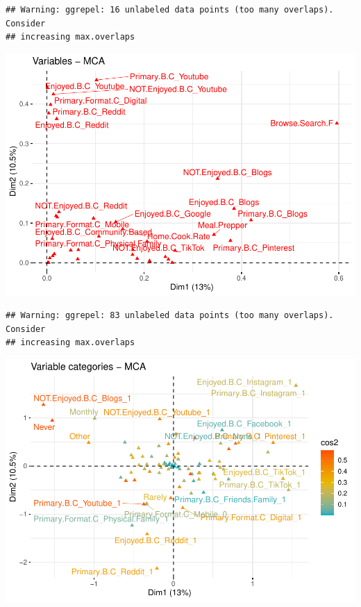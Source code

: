 \documentclass[
]{article}
\newenvironment{Shaded}{\begin{snugshade}}{\end{snugshade}}
\newcommand{\DataTypeTok}[1]{\textcolor[rgb]{0.13,0.29,0.53}{#1}}
\newcommand{\KeywordTok}[1]{\textcolor[rgb]{0.13,0.29,0.53}{\textbf{#1}}}
\newcommand{\NormalTok}[1]{#1}
\newcommand{\OtherTok}[1]{\textcolor[rgb]{0.56,0.35,0.01}{#1}}
\newcommand{\StringTok}[1]{\textcolor[rgb]{0.31,0.60,0.02}{#1}}
\begin{document}
\begin{verbatim}
## Warning: ggrepel: 16 unlabeled data points (too many overlaps). Consider
## increasing max.overlaps
\end{verbatim}

\includegraphics{Average-User-MCA_files/figure-latex/diet yes browse-2.pdf}

\begin{Shaded}
\end{Shaded}

\begin{verbatim}
## Warning: ggrepel: 83 unlabeled data points (too many overlaps). Consider
## increasing max.overlaps
\end{verbatim}

\includegraphics{Average-User-MCA_files/figure-latex/diet yes browse-3.pdf}
\end{document}
